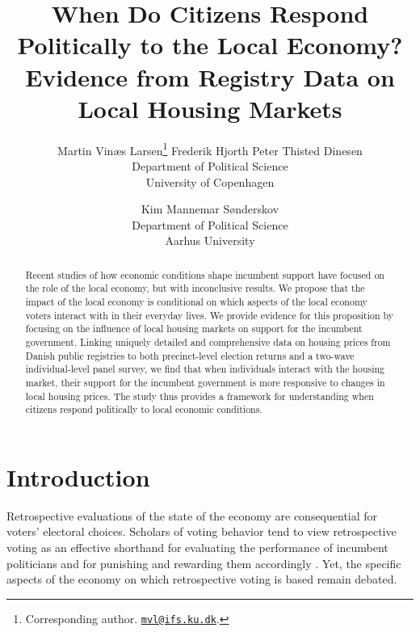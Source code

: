 \documentclass[12pt,a4paper]{article}
\title{\textbf{\Large{When Do Citizens Respond Politically to the Local Economy? Evidence from Registry Data on Local Housing Markets}}}
\author{Martin Vinæs Larsen\thanks{Corresponding author. \href{mailto:mvl@ifs.ku.dk}{\texttt{mvl@ifs.ku.dk}}. } \qquad Frederik Hjorth \qquad Peter Thisted  Dinesen \\Department of Political Science \\ University of Copenhagen \and Kim Mannemar  Sønderskov  \\Department of Political Science \\ Aarhus University   }
\begin{document}
	
	\maketitle
	
	\begin{abstract} \noindent Recent studies of how economic conditions shape incumbent support have focused on the role of the local economy, but with inconclusive results. We propose that the impact of the local economy is conditional on which aspects of the local economy voters interact with in their everyday lives. We provide evidence for this proposition by focusing on the influence of local housing markets on support for the incumbent government. Linking uniquely detailed and comprehensive data on housing prices from Danish public registries to both precinct-level election returns and a two-wave individual-level panel survey, we find that when individuals interact with the housing market, their support for the incumbent government is more responsive to changes in local housing prices. The study thus provides a framework for understanding when citizens respond politically to local economic conditions.
		
	\end{abstract}
	
	
	
	\newpage
	
	\onehalfspacing
	
	\section{Introduction}
	
	\noindent Retrospective evaluations of the state of the economy are consequential for voters' electoral choices. Scholars of voting behavior tend to view retrospective voting as an effective shorthand for evaluating the performance of incumbent politicians and for punishing and rewarding them accordingly \citep{ashworth2012electoral,healy2013retrospective}. Yet, the specific aspects of the economy on which retrospective voting is based remain debated. 
	
\end{document}
